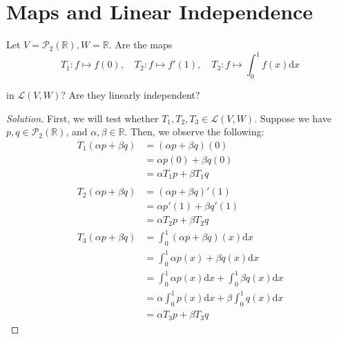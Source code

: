 \documentclass{article}
\newenvironment{solution}{\begin{proof}[Solution]}{\end{proof}}
\newcommand{\RR}{\mathbb{R}}
\begin{document}
	\newpage
	
	\section{Maps and Linear Independence}
	\begin{hw}
		Let $V = \mathscr{P}_{2}(\RR), W = \RR$. Are the maps
		\begin{equation*}
			T_{1}: f\mapsto f(0), \quad T_{2}: f \mapsto f'(1), \quad T_{3}: f \mapsto \int_0^{1} f(x) \mathrm d x
		\end{equation*}
	
		in $\mathcal L(V,W)$? Are they linearly independent?
	\end{hw}
	\begin{solution}
		\begin{comment}
			First, we will test whether $T_{1}, T_{2}, T_{3} \in \mathcal L(V,W)$. Suppose we have $p = ax^{2} + bx + c, q = dx^{2} + ex + f \in \mathscr{P}_{2}(\RR)$, and $\alpha, \beta \in \RR$. Then, we observe the following:
			\begin{align*}
				T_{1}(\alpha p + \beta q) &= [\alpha (ax^{2} + bx + c) + \beta(dx^{2} + ex + f)](0) \\
				&=\alpha (a(0)^{2} + b(0) + c) + \beta(d(0)^{2} + e(0) + f) \\
				&= \alpha c + \beta f \\
				&= \alpha 
				\\
				T_{2}(\alpha p + \beta q) &= (\alpha p + \beta q)'(1) \\
				&= \alpha p'(1) + \beta q'(1) \\
				&= \alpha T_{2}p + \beta T_{2}q
			\end{align*}
		\end{comment}
	
		First, we will test whether $T_{1}, T_{2}, T_{3} \in \mathcal L(V,W)$. Suppose we have $p, q \in \mathscr{P}_{2}(\RR)$, and $\alpha, \beta \in \RR$. Then, we observe the following:
		\begin{align*}
			T_{1}(\alpha p + \beta q) &= (\alpha p + \beta q)(0) \\
			&= \alpha p(0) + \beta q(0) \\
			&= \alpha T_{1}p + \beta T_{1}q\\
			\\
			T_{2}(\alpha p + \beta q) &= (\alpha p + \beta q)'(1) \\
			&= \alpha p'(1) + \beta q'(1) \\
			&= \alpha T_{2}p + \beta T_{2}q
			\\
			T_{3}(\alpha p + \beta q) &= \int_0^{1} (\alpha p + \beta q)(x) \mathrm d x \\
			&= \int_0^{1} \alpha p(x) + \beta q(x) \mathrm d x \\
			&= \int_{0}^{1} \alpha p(x) \mathrm d x + \int_0^{1} \beta q(x) \mathrm d x \\
			&= \alpha \int_0^{1} p(x) \mathrm d x + \beta \int_0^{1} q(x) \mathrm d x \\
			&= \alpha T_{3}p + \beta T_{3}q
		\end{align*}
		

\end{solution}
\end{document}
